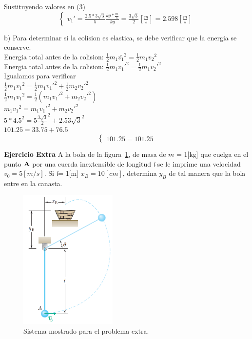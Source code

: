 \documentclass[a4paper,11pt]{scrartcl}
\begin{document}
\begin{center}
Sustituyendo valores en (3)\\
\hfill \break
\begin{equation*}
  \left\lbrace
  \begin{array}{l}
    {v_1}' = \frac{2.5 * 3\sqrt{3}}{5} \frac{kg * \frac{m}{s}}{kg} = \frac{3\sqrt{3}}{2} [\frac{m}{s}] = 2.598 [\frac{m}{s}]
  \end{array}
  \right.
\end{equation*}

b) Para determinar si la colision es elastica, se debe verificar que la energia se conserve.\\
\hfill \break
Energia total antes de la colision: $\frac{1}{2} m_1 \bar{v_1}^2 = \frac{1}{2} m_1 {v_2}^2$\\
\hfill \break
Energia total antes de la colision: $\frac{1}{2} m_1 \bar{v_1}'^2 = \frac{1}{2} m_1 {v_2}'^2$\\
\hfill \break
Igualamos para verificar\\
\hfill \break
$\frac{1}{2} m_1 {v_1}^2 = \frac{1}{2} m_1 {v_1}'^2 + \frac{1}{2} m_2 {v_2}'^2$\\
\hfill \break
$\frac{1}{2} m_1 {v_1}^2 = \frac{1}{2} (m_1 {v_1}'^2 + m_2 {v_2}'^2)$\\
\hfill \break
$m_1 {v_1}^2 = m_1 {v_1}'^2 + m_2 {v_2}'^2$\\
\hfill \break
$5 * {4.5}^2 = 5 {\frac{3\sqrt{3}}{2}}^2 + 2.5 {3\sqrt{3}}^2$\\
\hfill \break
$101.25 = 33.75 + 76.5$\\

\begin{equation*}
  \left\lbrace
  \begin{array}{l}
    101.25 = 101.25
  \end{array}
  \right.
\end{equation*}
\end{center}

\textbf{Ejercicio Extra} A la bola de la figura~\ref{fig:Extra_1}, de masa de $m$ =  1[kg] que cuelga en el punto ${\bf A}$ por una cuerda inextensible de longitud  \emph{l} se le imprime una velocidad $v_{0} = 5 [m/s]$. Si  \emph{l}= 1[m]  $x_{B} = 10 [cm]$, determina $y_{B}$ de tal manera que la bola entre en la canasta.\\

\begin{figure}[H]
  \centering
  \includegraphics[height=7cm]{Extra_1}
  \caption{Sistema mostrado para el problema extra.}
  \label{fig:Extra_1}
\end{figure}
\end{document}
